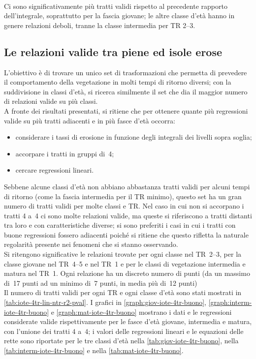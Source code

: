 %
\\
Ci sono significativamente più tratti validi rispetto al precedente rapporto dell'integrale, soprattutto per la fascia giovane; le altre classe d'età hanno in genere relazioni deboli, tranne la classe intermedia per TR \SIrange[range-phrase = {-}, range-units = single]{2}{3}{\mesi}.



\subsection{Le relazioni valide tra piene ed isole erose}
\label{sec:migliori-tratti-piene-erosione}
L'obiettivo è di trovare un unico set di trasformazioni che permetta di prevedere il comportamento della vegetazione in molti tempi di ritorno diversi; con la suddivisione in classi d'età, si ricerca similmente il set che dia il maggior numero di relazioni valide su più classi.
\\
A fronte dei risultati presentati, si ritiene che per ottenere quante più regressioni valide su più tratti adiacenti e in più fasce d'età occorra:
%
\begin{itemize}
	\item considerare i tassi di erosione in funzione degli integrali dei livelli sopra soglia;
	\item accorpare i tratti in gruppi di~4;
	\item cercare regressioni lineari.
\end{itemize}
%
Sebbene alcune classi d'età non abbiano abbastanza tratti validi per alcuni tempi di ritorno (come la fascia intermedia per il TR minimo), questo set ha un gran numero di tratti validi per molte classi e TR.
Nel caso in cui non si accorpano i tratti 4 a~4 ci sono molte relazioni valide, ma queste si riferiscono a tratti distanti tra loro e con caratteristiche diverse; si sono preferiti i casi in cui i tratti con buone regressioni fossero adiacenti poiché si ritiene che questo rifletta la naturale regolarità presente nei fenomeni che si stanno osservando.
\\
Si ritengono significative le relazioni trovate per ogni classe nel TR~\SIrange[range-phrase = {-}, range-units = single]{2}{3}{\mesi}, per la classe giovane nel TR~\SIrange[range-phrase = {-}, range-units = single]{4}{5}{\mesi} e nel TR~\SI{1}{\anno} e per le classi di vegetazione intermedia e matura nel TR~\SI{1}{\anno}.
Ogni relazione ha un discreto numero di punti (da un massimo di~17 punti ad un minimo di~7 punti, in media più di~12 punti)
\\
Il numero di tratti validi per ogni TR e ogni classe d'età sono stati mostrati in \cref{tab:iote-4tr-lin-ntr-r2-pval}.
I grafici in \cref{graph:giov-iote-4tr-buono}, \cref{graph:interm-iote-4tr-buono} e \cref{graph:mat-iote-4tr-buono} mostrano i dati e le regressioni considerate valide rispettivamente per le fasce d'età giovane, intermedia e matura, con l'unione dei tratti 4 a~4;
i valori delle regressioni lineari e le equazioni delle rette sono riportate per le tre classi d'età nella \cref{tab:giov-iote-4tr-buono}, nella \cref{tab:interm-iote-4tr-buono} e nella \cref{tab:mat-iote-4tr-buono}.

